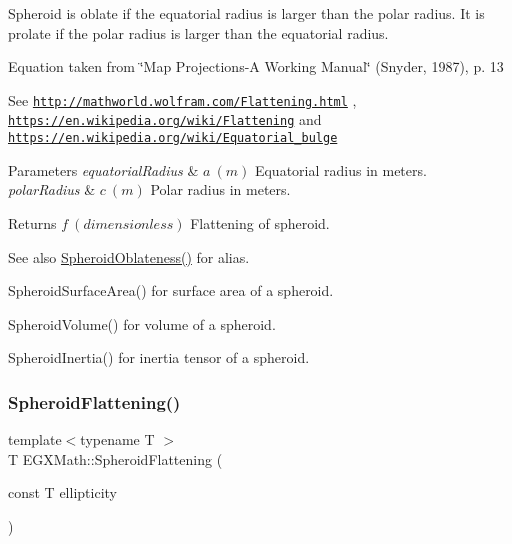 Spheroid is oblate if the equatorial radius is larger than the polar radius. It is prolate if the polar radius is larger than the equatorial radius.

Equation taken from \char`\"{}\+Map Projections-\/\+A Working Manual\char`\"{} (Snyder, 1987), p. 13

See \href{http://mathworld.wolfram.com/Flattening.html}{\tt http\+://mathworld.\+wolfram.\+com/\+Flattening.\+html} , \href{https://en.wikipedia.org/wiki/Flattening}{\tt https\+://en.\+wikipedia.\+org/wiki/\+Flattening} and \href{https://en.wikipedia.org/wiki/Equatorial_bulge}{\tt https\+://en.\+wikipedia.\+org/wiki/\+Equatorial\+\_\+bulge} 
\begin{DoxyParams}{Parameters}
{\em equatorial\+Radius} & $ a\ (m)$ Equatorial radius in meters. \\
\hline
{\em polar\+Radius} & $ c\ (m)$ Polar radius in meters. \\
\hline
\end{DoxyParams}
\begin{DoxyReturn}{Returns}
$ f\ (dimensionless)$ Flattening of spheroid. 
\end{DoxyReturn}
\begin{DoxySeeAlso}{See also}
\mbox{\hyperlink{group___e_g_x_math-_geometry-3_d-_spheroid-_flattening_gaf2530de595124e75a7f58482d617cfce}{Spheroid\+Oblateness()}} for alias. 

Spheroid\+Surface\+Area() for surface area of a spheroid. 

Spheroid\+Volume() for volume of a spheroid. 

Spheroid\+Inertia() for inertia tensor of a spheroid. 
\end{DoxySeeAlso}
\mbox{\label{group___e_g_x_math-_geometry-3_d-_spheroid-_flattening_gacd0d1ae60af3a7f1a09ed2f65636c132}} 
\subsubsection{\texorpdfstring{Spheroid\+Flattening()}{SpheroidFlattening()}\hspace{0.1cm}{\footnotesize\ttfamily [2/2]}}
{\footnotesize\ttfamily template$<$typename T $>$ \\
T E\+G\+X\+Math\+::\+Spheroid\+Flattening (\begin{DoxyParamCaption}\item[{const T}]{ellipticity }\end{DoxyParamCaption})}



